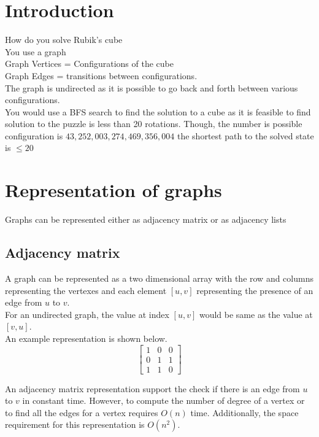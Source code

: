 \documentclass{article}
\begin{document}

\section{Introduction}

How do you solve Rubik's cube\\
You use a graph\\
Graph Vertices = Configurations of the cube\\
Graph Edges = transitions between configurations.\\
The graph is undirected as it is possible to go back and forth between various configurations.\\

You would use a BFS search to find the solution to a cube as it is feasible to find solution to the puzzle is less than 20 rotations. Though, the number is possible configuration is $43,252,003,274,469,356,004$ the shortest path to the solved state is $\leq 20$ 

\section{Representation of graphs}

Graphs can be represented either as adjacency matrix or as adjacency lists

\subsection{Adjacency matrix}

A graph can be represented as a two dimensional array with the row and columns representing the vertexes and each element $[u,v]$ representing the presence of an edge from $u$ to $v$.\\
For an undirected graph, the value at index $[u,v]$ would be same as the value at $[v,u]$.\\

An example representation is shown below.
\begin{equation*}
	\begin{bmatrix}
		1 & 0 & 0\\
		0 & 1 & 1\\
		1 & 1 & 0 
	\end{bmatrix}
\end{equation*}
	
An adjacency matrix representation support the check if there is an edge from $u$ to $v$ in constant time.  However, to compute the number of degree of a vertex or to find all the edges for a vertex requires $O(n)$ time. Additionally, the space requirement for this representation is $O(n^2)$.\\
\end{document}
